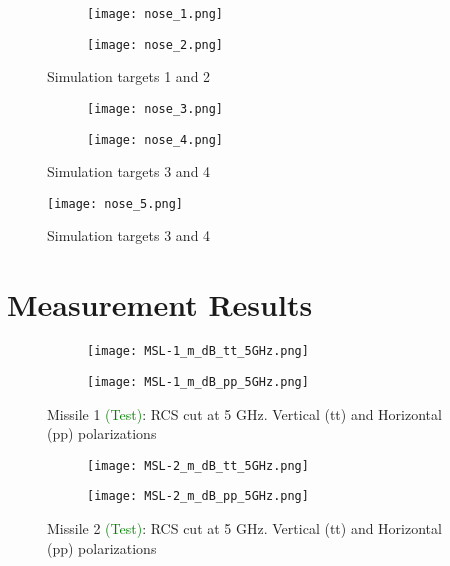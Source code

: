   \begin{figure}[htbp]
    \centering
    \begin{subfigure}{.5\textwidth}
      \centering
      \texttt{[image: nose\_1.png]}
    \end{subfigure}%
    \begin{subfigure}{.5\textwidth}
      \centering
      \texttt{[image: nose\_2.png]}
    \end{subfigure}
    \caption{Simulation targets 1 and 2}
    \label{fig:nose_1_2}
  \end{figure}

  \begin{figure}[htbp]
    \centering
    \begin{subfigure}{.5\textwidth}
      \centering
      \texttt{[image: nose\_3.png]}
    \end{subfigure}%
    \begin{subfigure}{.5\textwidth}
      \centering
      \texttt{[image: nose\_4.png]}
    \end{subfigure}
    \caption{Simulation targets 3 and 4}
    \label{fig:nose_3_4}
  \end{figure}

  \begin{figure}[htbp]
    \centering
    \texttt{[image: nose\_5.png]}
    \caption{Simulation targets 3 and 4}
    \label{fig:nose_5}
  \end{figure}


\chapter{Measurement Results}
\label{app:measurement_results}
  \begin{figure}[htbp]
    \centering
    \begin{subfigure}{.5\textwidth}
      \centering
      \texttt{[image: MSL-1\_m\_dB\_tt\_5GHz.png]}
    \end{subfigure}%
    \begin{subfigure}{.5\textwidth}
      \centering
      \texttt{[image: MSL-1\_m\_dB\_pp\_5GHz.png]}
    \end{subfigure}
    \caption{Missile 1 \textcolor{green}{(Test)}:  RCS cut at 5 GHz. Vertical (tt) and Horizontal (pp) polarizations }
    \label{fig:n1}
  \end{figure}

  \begin{figure}[htbp]
    \centering
    \begin{subfigure}{.5\textwidth}
      \centering
      \texttt{[image: MSL-2\_m\_dB\_tt\_5GHz.png]}
    \end{subfigure}%
    \begin{subfigure}{.5\textwidth}
      \centering
      \texttt{[image: MSL-2\_m\_dB\_pp\_5GHz.png]}
    \end{subfigure}
    \caption{Missile 2 \textcolor{green}{(Test)}:  RCS cut at 5 GHz. Vertical (tt) and Horizontal (pp) polarizations }
    \label{fig:n2}
  \end{figure}


